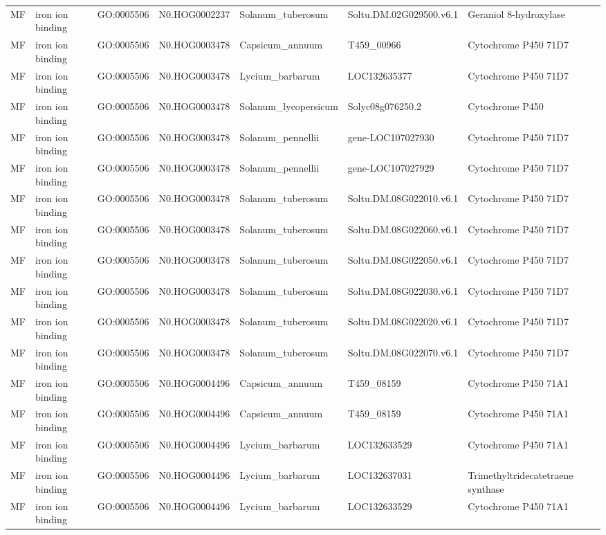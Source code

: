\begin{table}
\begin{tabular}[t]{lllllll}
MF & iron ion binding & GO:0005506 & N0.HOG0002237 & Solanum\_tuberosum & Soltu.DM.02G029500.v6.1 & Geraniol 8-hydroxylase\\
MF & iron ion binding & GO:0005506 & N0.HOG0003478 & Capsicum\_annuum & T459\_00966 & Cytochrome P450 71D7\\
MF & iron ion binding & GO:0005506 & N0.HOG0003478 & Lycium\_barbarum & LOC132635377 & Cytochrome P450 71D7\\
MF & iron ion binding & GO:0005506 & N0.HOG0003478 & Solanum\_lycopersicum & Solyc08g076250.2 & Cytochrome P450\\
MF & iron ion binding & GO:0005506 & N0.HOG0003478 & Solanum\_pennellii & gene-LOC107027930 & Cytochrome P450 71D7\\
MF & iron ion binding & GO:0005506 & N0.HOG0003478 & Solanum\_pennellii & gene-LOC107027929 & Cytochrome P450 71D7\\
MF & iron ion binding & GO:0005506 & N0.HOG0003478 & Solanum\_tuberosum & Soltu.DM.08G022010.v6.1 & Cytochrome P450 71D7\\
MF & iron ion binding & GO:0005506 & N0.HOG0003478 & Solanum\_tuberosum & Soltu.DM.08G022060.v6.1 & Cytochrome P450 71D7\\
MF & iron ion binding & GO:0005506 & N0.HOG0003478 & Solanum\_tuberosum & Soltu.DM.08G022050.v6.1 & Cytochrome P450 71D7\\
MF & iron ion binding & GO:0005506 & N0.HOG0003478 & Solanum\_tuberosum & Soltu.DM.08G022030.v6.1 & Cytochrome P450 71D7\\
MF & iron ion binding & GO:0005506 & N0.HOG0003478 & Solanum\_tuberosum & Soltu.DM.08G022020.v6.1 & Cytochrome P450 71D7\\
MF & iron ion binding & GO:0005506 & N0.HOG0003478 & Solanum\_tuberosum & Soltu.DM.08G022070.v6.1 & Cytochrome P450 71D7\\
MF & iron ion binding & GO:0005506 & N0.HOG0004496 & Capsicum\_annuum & T459\_08159 & Cytochrome P450 71A1\\
MF & iron ion binding & GO:0005506 & N0.HOG0004496 & Capsicum\_annuum & T459\_08159 & Cytochrome P450 71A1\\
MF & iron ion binding & GO:0005506 & N0.HOG0004496 & Lycium\_barbarum & LOC132633529 & Cytochrome P450 71A1\\
MF & iron ion binding & GO:0005506 & N0.HOG0004496 & Lycium\_barbarum & LOC132637031 & Trimethyltridecatetraene synthase\\
MF & iron ion binding & GO:0005506 & N0.HOG0004496 & Lycium\_barbarum & LOC132633529 & Cytochrome P450 71A1\\

\end{tabular}
\end{table}
